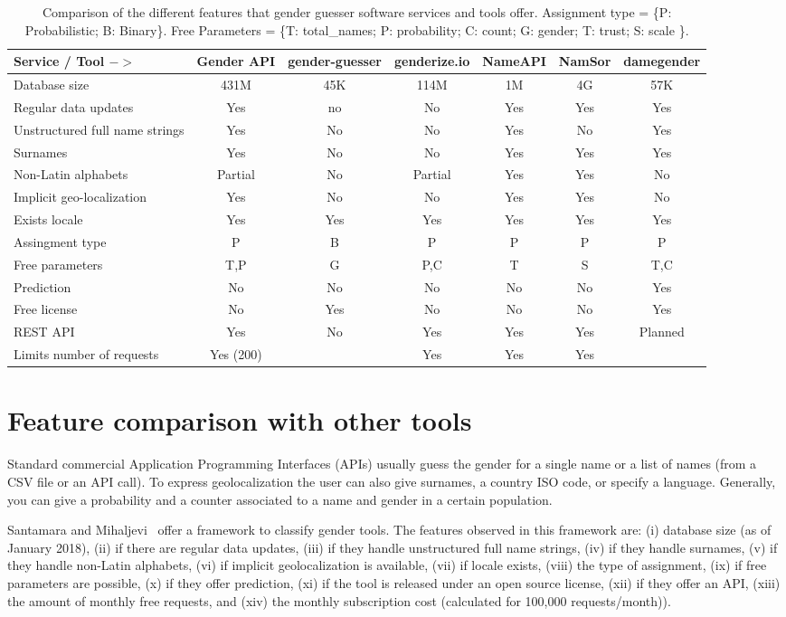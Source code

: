 \documentclass[a4paper]{article}
\def\infinity{\rotatebox{90}{8}}
\begin{document}
\begin{table*}[ht]
\footnotesize
\begin{tabular}[]{lcccccc}
\hline
Service / Tool $->$ & Gender API & gender-guesser & genderize.io & NameAPI & NamSor & damegender\tabularnewline
\hline
Database size & 431M & 45K & 114M & 1M & 4G & 57K \tabularnewline
Regular data updates & Yes & no & No & Yes & Yes & Yes\tabularnewline
Unstructured full name strings & Yes & No & No & Yes & No & Yes\tabularnewline
Surnames & Yes & No & No & Yes & Yes & Yes\tabularnewline
Non-Latin alphabets & Partial & No & Partial & Yes & Yes & No\tabularnewline
Implicit geo-localization & Yes & No & No & Yes & Yes & No\tabularnewline
Exists locale & Yes & Yes & Yes & Yes & Yes & Yes\tabularnewline
Assingment type & P & B & P & P & P & P \tabularnewline
Free parameters & T,P & G & P,C & T & S & T,C\tabularnewline
Prediction & No & No & No & No & No & Yes\tabularnewline
Free license & No & Yes & No & No & No & Yes\tabularnewline
REST API & Yes & No & Yes & Yes & Yes & Planned\tabularnewline
Limits number of requests & Yes (200) & \infinity & Yes & Yes & Yes & \infinity \tabularnewline
\hline
\end{tabular}
\caption{Comparison of the different features that gender guesser software services and tools offer. Assignment type = \{P: Probabilistic; B: Binary\}. Free Parameters = \{T: total\_names; P: probability; C: count; G: gender; T: trust; S: scale \}.  }
\label{table:comparison}
\end{table*}

\section{Feature comparison with other tools}

Standard commercial Application Programming Interfaces (APIs) usually guess the gender for a single name or a list of names (from a CSV file or an API call). 
To express geolocalization the user can also give surnames, a country ISO code, or specify a language.
Generally, you can give a probability and a counter associated to a name and gender in a certain population.

Santamara and Mihaljevi~\cite{10.7717/peerj-cs.156} offer a framework to classify gender tools.
The features observed in this framework are: (i) database size (as of January 2018), (ii) if there are regular data updates, (iii) if they handle unstructured full name strings, (iv) if they handle surnames, (v) if they handle non-Latin alphabets, (vi) if implicit geolocalization is available, (vii) if locale exists, (viii) the type of assignment, (ix) if free parameters are possible, (x) if they offer prediction, (xi) if the tool is released under an open source license, (xii) if they offer an API, (xiii) the amount of monthly free requests, and (xiv) the monthly subscription cost (calculated for 100,000 requests/month)).
\end{document}
